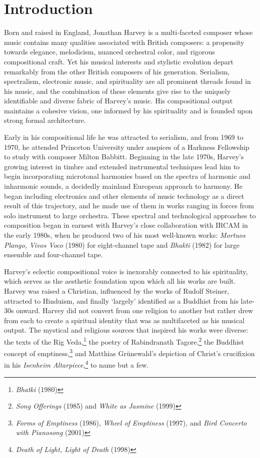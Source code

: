 \section{Introduction}\label{introduction}

\setlength{\parindent}{0.4in} Born and raised in England, Jonathan Harvey is a multi-faceted composer whose music contains many qualities associated with British composers: a propensity towards elegance, melodicism, nuanced orchestral color, and rigorous compositional craft. Yet his musical interests and stylistic evolution depart remarkably from the other British composers of his generation. Serialism, spectralism, electronic music, and spirituality are all prominent threads found in his music, and the combination of these elements give rise to the uniquely identifiable and diverse fabric of Harvey's music. His compositional output maintains a cohesive vision, one informed by his spirituality and is founded upon strong formal architecture.

Early in his compositional life he was attracted to serialism, and from 1969 to 1970, he attended Princeton University under auspices of a Harkness Fellowship to study with composer Milton Babbitt. Beginning in the late 1970s, Harvey's growing interest in timbre and extended instrumental techniques lead him to begin incorporating microtonal harmonies based on the spectra of harmonic and inharmonic sounds, a decidedly mainland European approach to harmony. He began including electronics and other elements of music technology as a direct result of this trajectory, and he made use of them in works ranging in forces from solo instrument to large orchestra. These spectral and technological approaches to composition began in earnest with Harvey's close collaboration with IRCAM in the early 1980s, when he produced two of his most well-known works: \emph{Mortuos Plango, Vivos Voco} (1980) for eight-channel tape and \emph{Bhakti} (1982) for large ensemble and four-channel tape.

Harvey's eclectic compositional voice is inexorably connected to his spirituality, which serves as the aesthetic foundation upon which all his works are built. Harvey was raised a Christian, influenced by the works of Rudolf Steiner, attracted to Hinduism, and finally `largely' identified as a Buddhist from his late-30s onward. Harvey did not convert from one religion to another but rather drew from each to create a spiritual identity that was as multifaceted as his musical output. The mystical and religious sources that inspired his works were diverse: the texts of the Rig Veda,\footnote{\emph{Bhatki} (1980)} the poetry of Rabindranath Tagore,\footnote{\emph{Song Offerings} (1985) and \emph{White as Jasmine} (1999)} the Buddhist concept of emptiness,\footnote{\emph{Forms of Emptiness} (1986), \emph{Wheel of Emptiness} (1997), and \emph{Bird Concerto with Pianosong} (2001)} and Matthias Gr{ü}newald's depiction of Christ's crucifixion in his \emph{Isenheim Altarpiece},\footnote{\emph{Death of Light, Light of Death} (1998)} to name but a few.

